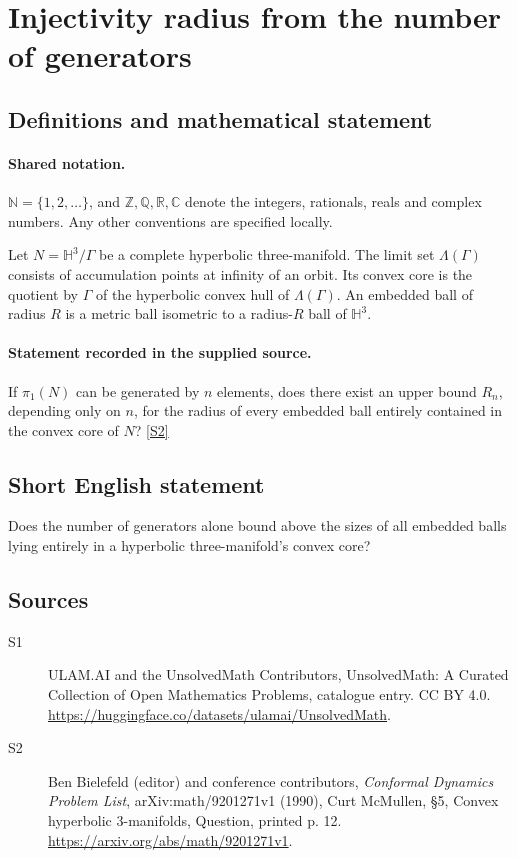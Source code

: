 \documentclass[11pt]{article}
\newcommand{\sref}[2]{\hyperlink{source:#1:#2}{[S#2]}}
\begin{document}
\section{Injectivity radius from the number of generators}\label{statement}

\subsection{Definitions and mathematical statement}

\paragraph{Shared notation.}$\mathbb N=\{1,2,\ldots\}$, and $\mathbb Z,\mathbb Q,\mathbb R,\mathbb C$ denote the integers, rationals, reals and complex numbers. Any other conventions are specified locally.


Let $N=\mathbb H^3/\Gamma$ be a complete hyperbolic three-manifold. The limit set $\Lambda(\Gamma)$ consists of accumulation points at infinity of an orbit. Its convex core is the quotient by $\Gamma$ of the hyperbolic convex hull of $\Lambda(\Gamma)$. An embedded ball of radius $R$ is a metric ball isometric to a radius-$R$ ball of $\mathbb H^3$.
\paragraph{Statement recorded in the supplied source.}
If $\pi_1(N)$ can be generated by $n$ elements, does there exist an upper bound $R_n$, depending only on $n$, for the radius of every embedded ball entirely contained in the convex core of $N$? \sref{statement}{2}
\subsection{Short English statement}
Does the number of generators alone bound above the sizes of all embedded balls lying entirely in a hyperbolic three-manifold’s convex core?
\subsection{Sources}
\begin{description}
\item[\hypertarget{source:statement:1}{S1}] ULAM.AI and the UnsolvedMath Contributors, UnsolvedMath: A Curated Collection of Open Mathematics Problems, catalogue entry. CC BY 4.0. \url{https://huggingface.co/datasets/ulamai/UnsolvedMath}.
\item[\hypertarget{source:statement:2}{S2}] Ben Bielefeld (editor) and conference contributors, \emph{Conformal Dynamics Problem List}, arXiv:math/9201271v1 (1990), Curt McMullen, \S5, Convex hyperbolic 3-manifolds, Question, printed p. 12. \url{https://arxiv.org/abs/math/9201271v1}.
\end{description}
\label{end:statement}
\end{document}
